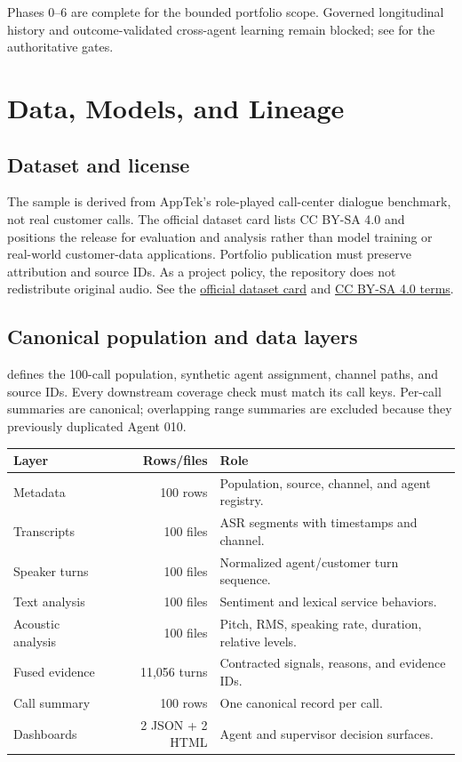 \documentclass[11pt,letterpaper]{article}
\begin{document}
Phases 0--6 are complete for the bounded portfolio scope. Governed longitudinal
history and outcome-validated cross-agent learning remain blocked; see
 for the authoritative gates.

\clearpage
\section{Data, Models, and Lineage}

\subsection{Dataset and license}

The sample is derived from AppTek's role-played call-center dialogue benchmark, not
real customer calls. The official dataset card lists CC BY-SA 4.0 and positions the
release for evaluation and analysis rather than model training or real-world
customer-data applications. Portfolio publication must preserve attribution and
source IDs. As a project policy, the repository does not redistribute original audio.
See the \href{https://huggingface.co/datasets/apptek-com/apptek_callcenter_dialogues}{official dataset card}
and \href{https://creativecommons.org/licenses/by-sa/4.0/}{CC BY-SA 4.0 terms}.

\subsection{Canonical population and data layers}

 defines the 100-call population, synthetic
agent assignment, channel paths, and source IDs. Every downstream coverage check must
match its call keys. Per-call summaries are canonical; overlapping range summaries are
excluded because they previously duplicated Agent 010.

\begin{center}\small
\begin{tabular}{p{}rp{}}
\toprule
Layer & Rows/files & Role \\
\midrule
Metadata & 100 rows & Population, source, channel, and agent registry. \\
Transcripts & 100 files & ASR segments with timestamps and channel. \\
Speaker turns & 100 files & Normalized agent/customer turn sequence. \\
Text analysis & 100 files & Sentiment and lexical service behaviors. \\
Acoustic analysis & 100 files & Pitch, RMS, speaking rate, duration, relative levels. \\
Fused evidence & 11,056 turns & Contracted signals, reasons, and evidence IDs. \\
Call summary & 100 rows & One canonical record per call. \\
Dashboards & 2 JSON + 2 HTML & Agent and supervisor decision surfaces. \\
\bottomrule
\end{tabular}
\end{center}
\end{document}
